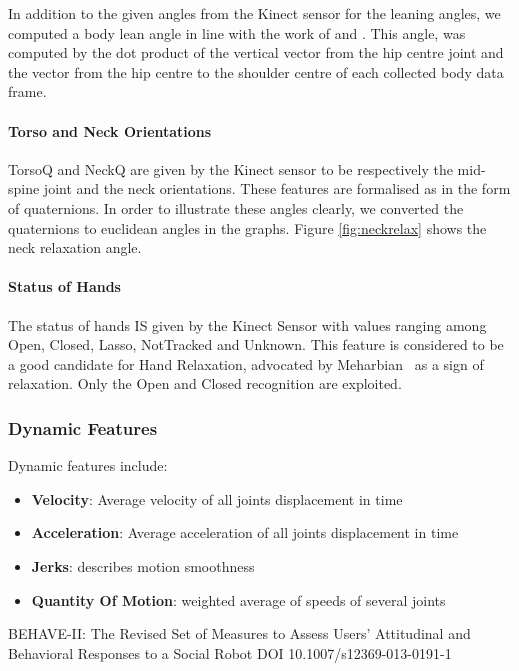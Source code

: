 \documentclass[a4paper,twocolumn]{svjour3}
\begin{document}
In addition to the given angles from the Kinect sensor for the leaning angles, we computed a body lean angle in line with the work of \cite{Castellano2009} and \cite{Schegloff}. This angle, was computed by the dot product of the vertical vector from the hip centre joint and the vector from the hip centre to the shoulder centre of each collected body data frame. 

\paragraph{Torso and Neck Orientations}
TorsoQ and NeckQ are given by the Kinect sensor to be respectively the mid-spine joint and the neck orientations. 
These features are formalised as in the form of quaternions. 
In order to illustrate  these angles clearly, we converted the quaternions to euclidean angles in the graphs.
Figure \ref{fig:neckrelax} shows the neck relaxation angle.


\paragraph{Status of Hands}
The status of hands IS given by the Kinect Sensor with values ranging among Open, Closed, Lasso, NotTracked and Unknown. 
This feature is considered to be a good candidate for Hand Relaxation, advocated by Meharbian~\cite{Mehrabian1968} as a sign of relaxation. 
Only the Open and Closed recognition are exploited. 

\subsubsection{Dynamic Features}
Dynamic features include:
\begin{itemize}[noitemsep,nolistsep]
\item \textbf{Velocity}: Average velocity of all joints displacement in time
\item \textbf{Acceleration}: Average acceleration of all joints displacement in time 
\item \textbf{Jerks}: describes motion smoothness
\item \textbf{Quantity Of Motion}: weighted average of speeds of several joints
\end{itemize}





BEHAVE-II: The Revised Set of Measures to Assess Users’
Attitudinal and Behavioral Responses to a Social Robot
DOI 10.1007/s12369-013-0191-1
\end{document}
